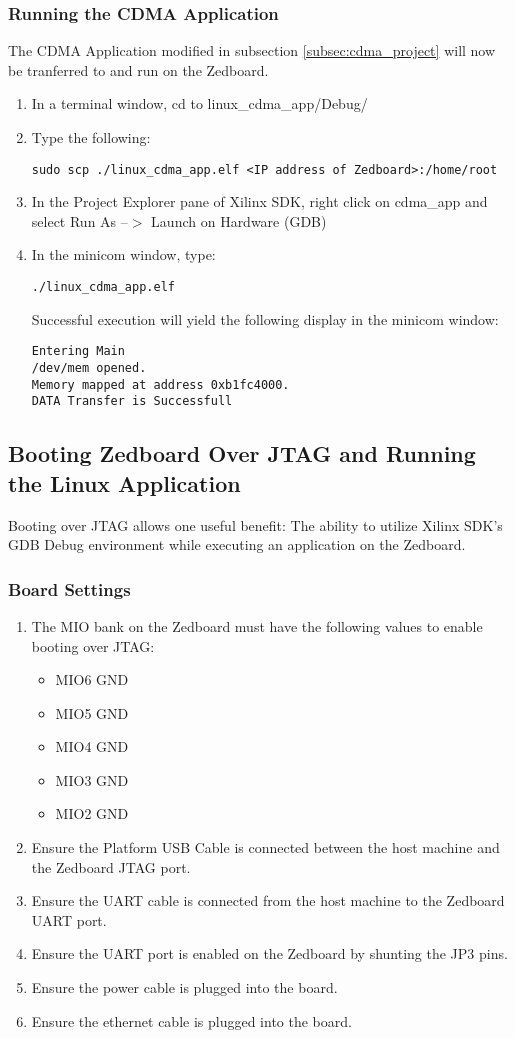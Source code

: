 \subsubsection{Running the CDMA Application}
The CDMA Application modified in subsection \ref{subsec:cdma_project} will now be tranferred to and run on the Zedboard.
\begin{enumerate}
\item In a terminal window, cd to linux\_cdma\_app/Debug/
\item Type the following:
\begin{lstlisting}
sudo scp ./linux_cdma_app.elf <IP address of Zedboard>:/home/root
\end{lstlisting}
\item In the Project Explorer pane of Xilinx SDK, right click on cdma\_app and select Run As --$>$ Launch on Hardware (GDB)
\item In the minicom window, type:
\begin{lstlisting}
./linux_cdma_app.elf
\end{lstlisting}
Successful execution will yield the following display in the minicom window:
\begin{lstlisting}
Entering Main
/dev/mem opened.
Memory mapped at address 0xb1fc4000.
DATA Transfer is Successfull
\end{lstlisting}
\end{enumerate}

\subsection{Booting Zedboard Over JTAG and Running the Linux Application}
Booting over JTAG allows one useful benefit: The ability to utilize Xilinx SDK's GDB Debug environment while executing an application on the Zedboard.

\subsubsection{Board Settings}
\begin{enumerate}
\item The MIO bank on the Zedboard must have the following values to enable booting over JTAG:
\begin{itemize}
\item MIO6 GND
\item MIO5 GND
\item MIO4 GND
\item MIO3 GND
\item MIO2 GND
\end{itemize}
\item Ensure the Platform USB Cable is connected between the host machine and the Zedboard JTAG port.
\item Ensure the UART cable is connected from the host machine to the Zedboard UART port.
\item Ensure the UART port is enabled on the Zedboard by shunting the JP3 pins.
\item Ensure the power cable is plugged into the board.
\item Ensure the ethernet cable is plugged into the board.
\end{enumerate}
